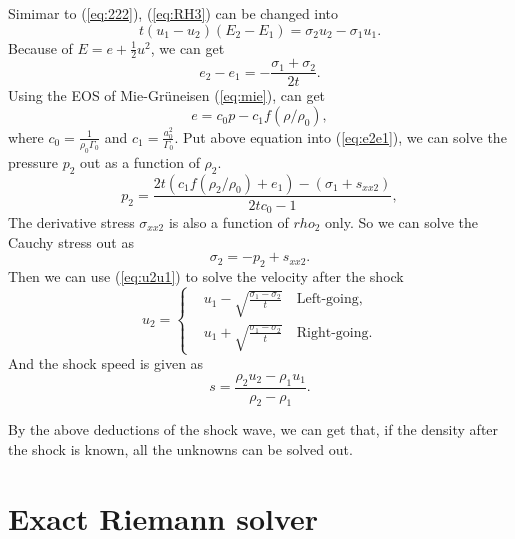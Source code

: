\documentclass[review]{elsarticle}
\begin{document}
Simimar to (\ref{eq:222}), (\ref{eq:RH3}) can be changed into
\begin{equation}
  t(u_1-u_2)(E_2-E_1) =\sigma_2 u_2-\sigma_1u_1.
\end{equation}
Because of $E= e+\frac{1}{2}u^2$, we can get
\begin{equation}\label{eq:e2e1}
  e_2 - e_1 = - \frac{\sigma_1 +\sigma_2}{2t}.
\end{equation}
Using the EOS of Mie-Gr\"uneisen (\ref{eq:mie}), can get
\begin{equation}
  e = c_0p -c_1f(\rho/\rho_0),
\end{equation}
where $c_0 = \frac{1}{\rho_0\Gamma_0}$ and $c_1 = \frac{a_0^2}{\Gamma_0}$.
Put above equation into (\ref{eq:e2e1}), we can solve the pressure $p_2$ out as a function of $\rho_2$. 
\begin{equation}\label{eq:shockp}
  p_2= \frac{2t(c_1f(\rho_2/\rho_0)+e_1)-(\sigma_1+s_{xx2})}{2tc_0-1},
\end{equation}
The derivative stress $\sigma_{xx2}$ is also a function of $rho_2$ only. So we can solve the Cauchy stress out as
\begin{equation}
  \sigma_2 = -p_2 +s_{xx2}.
\end{equation}
Then we can use (\ref{eq:u2u1}) to solve the velocity after the shock
\begin{equation}\label{eq:shocku}
  u_2 = \left\{ \begin{aligned}
	 & u_1 - \sqrt{\frac{\sigma_1- \sigma_2}{t}} \quad \text{Left-going}, \\
	 & u_1 + \sqrt{\frac{\sigma_1- \sigma_2}{t}} \quad \text{Right-going}.
	\end{aligned}
	\right.
  \end{equation}
And the shock speed is given as 
\begin{equation}
  s = \frac{\rho_2u_2-\rho_1u_1}{\rho_2-\rho_1}.
\end{equation}

By the above deductions of the shock wave, we can get that, if the density after the shock is known, all the unknowns can be solved out.

\section{Exact Riemann solver}\label{sec:riemann}
\end{document}
